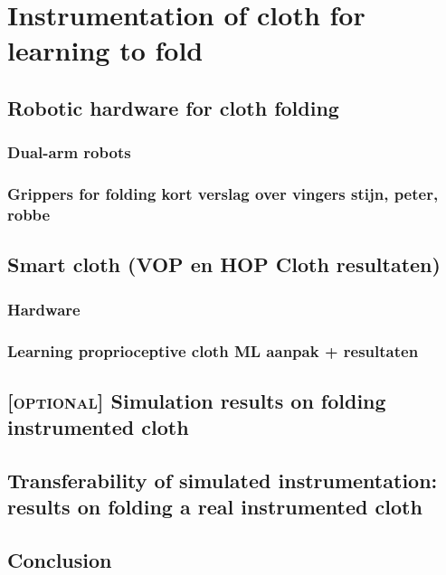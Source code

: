 \documentclass[\home/main.tex]{subfiles}
\begin{document}
\chapter{Instrumentation of cloth for learning to fold}\label{ch:instrumentation}

\section{Robotic hardware for cloth folding}
\subsection{Dual-arm robots}
\subsection{Grippers for folding \tiny{kort verslag over vingers stijn, peter, robbe}}


\section{Smart cloth \tiny{(VOP en HOP Cloth resultaten)}}
\subsection{Hardware} %
\subsection{Learning proprioceptive cloth \tiny{ML aanpak + resultaten}}

\section{\textsc{[optional]} Simulation results on folding instrumented cloth}
\section{Transferability of simulated instrumentation: results on folding a real instrumented cloth}
\section{Conclusion}
\end{document}
